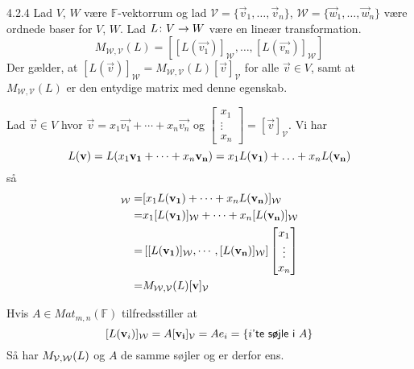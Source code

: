 %
% 

\begin{saetning}{4.2.4}
	Lad $V$, $W$ være $\mathbb{F}$-vektorrum og lad $\mathcal{V}=\{\vec{v}_1,
	\dotsc,\vec{v}_n\}$, $\mathcal{W}=\{\vec{w}_1,\dotsc,\vec{w}_n\}$ være
	ordnede baser for $V$, $W$. Lad $L \colon V \rightarrow W$ være en lineær transformation.
	\[
		M_{\mathcal{W},\mathcal{V}}(L) = [[L(\vec{v_1})]_\mathcal{W}, \dotsc,
		[L(\vec{v_n})]_\mathcal{W}]
	\]
	Der gælder, at $[L(\vec{v})]_\mathcal{W} = M_{\mathcal{W},\mathcal{V}}(L)
	[\vec{v}]_\mathcal{V}$ for alle $\vec{v} \in V$, samt at
	$M_{\mathcal{W},\mathcal{V}}(L)$ er den entydige matrix med denne egenskab.
\end{saetning}

\begin{bevis}
	Lad $\vec{v} \in V$ hvor $\vec{v} = x_1 \vec{v_1} + \cdots + x_n \vec{v_n}$
	og $\begin{bmatrix} x_1 \\ \vdots \\ x_n \end{bmatrix} =
	[\vec{v}]_\mathcal{V}$. Vi har
	\[
		L(\mathbf{v}) = L(x_1 \mathbf{v_1} + \cdots + x_n \mathbf{v_n}) = x_1L(\mathbf{v_1}) + 
		\dotsc + x_nL(\mathbf{v_n})
	\]
	så
	\begin{align*}
		[L(\vv)]_\sW =& [x_1 L(\vec{v_1}) + \cdots + x_n L(\vec{v_n})]_\sW \\
			=& x_1 [L(\vec{v_1})]_\sW + \cdots + x_n [L(\vec{v_n})]_\sW \\
			=& \left[ [L(\vec{v_1})]_\sW, \cdots, [L(\vec{v_n})]_\sW
				\right] \begin{bmatrix}
					x_1 \\
					\vdots \\
					x_n
				\end{bmatrix} \\
			=& M_{\sW,\sV}(L) [\vv]_\sV
	\end{align*}

	Hvis $A \in Mat_{m,n}(\mathbb{F})$ tilfredsstiller at
	\[
		[L(\mathbf{v}_i)]_{\mathcal{W}} = A[\mathbf{v_i}]_{\mathcal{V}} = Ae_i = \{i \textsf{'te søjle i } A\}
	\]
	Så har $M_{\mathcal{V},\mathcal{W}}(L)$ og $A$ de samme søjler og er derfor ens.
\end{bevis}
